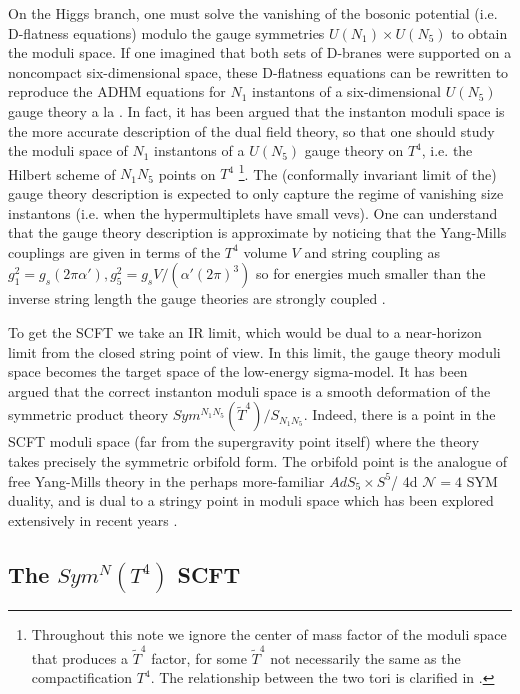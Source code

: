 \documentclass[11pt]{amsart}
\newcommand{\mc}{\mathcal}
\theoremstyle{thm}
\numberwithin{equation}{subsection}
\theoremstyle{def}
\theoremstyle{rem}
\begin{document}
On the Higgs branch, one must solve the vanishing of the bosonic potential (i.e. D-flatness equations) modulo the gauge symmetries $U(N_1)\times U(N_5)$ to obtain the moduli space. 
If one imagined that both sets of D-branes were supported on a noncompact six-dimensional space, these D-flatness equations can be rewritten to reproduce the ADHM equations for $N_1$ instantons of a six-dimensional $U(N_5)$ gauge theory a la \cite{WittenADHM}. 
In fact, it has been argued that the instanton moduli space is the more accurate description of the dual field theory, so that one should study the moduli space of $N_1$ instantons of a $U(N_5)$ gauge theory on $T^4$, i.e. the Hilbert scheme of $N_1 N_5$ points on $T^4$ \footnote{Throughout this note we ignore the center of mass factor of the moduli space that produces a $\tilde{T}^4$ factor, for some $\tilde{T}^4$ not necessarily the same as the compactification $T^4$. The relationship between the two tori is clarified in \cite{GiveonKutasovSeiberg}.}. The (conformally invariant limit of the) gauge theory description is expected to only capture the regime of vanishing size instantons (i.e. when the hypermultiplets have small vevs). One can understand that the gauge theory description is approximate by noticing that the Yang-Mills couplings are given in terms of the $T^4$ volume $V$ and string coupling as $g_1^2 = g_s (2 \pi \alpha'), g_5^2 = g_s V/(\alpha' (2\pi)^3)$ so for energies much smaller than the inverse string length the gauge theories are strongly coupled \cite{Davidetal}. 


To get the SCFT we take an IR limit, which would be dual to a near-horizon limit from the closed string point of view. In this limit, the gauge theory moduli space becomes the target space of the low-energy sigma-model. It has been argued that the correct instanton moduli space is a smooth deformation of the symmetric product theory $Sym^{N_1 N_5}(\tilde{T}^4)/S_{N_1 N_5}$. Indeed, there is a point in the SCFT moduli space (far from the supergravity point itself) where the theory takes precisely the symmetric orbifold form. The orbifold point is the analogue of free Yang-Mills theory in the perhaps more-familiar $AdS_5\times S^5$/ 4d $\mc N =4$ SYM duality, and is dual to a stringy point in moduli space which has been explored extensively in recent years \cite{Eberhardtetal}.

\subsection{The $Sym^N(T^4)$ SCFT} 
\end{document}
